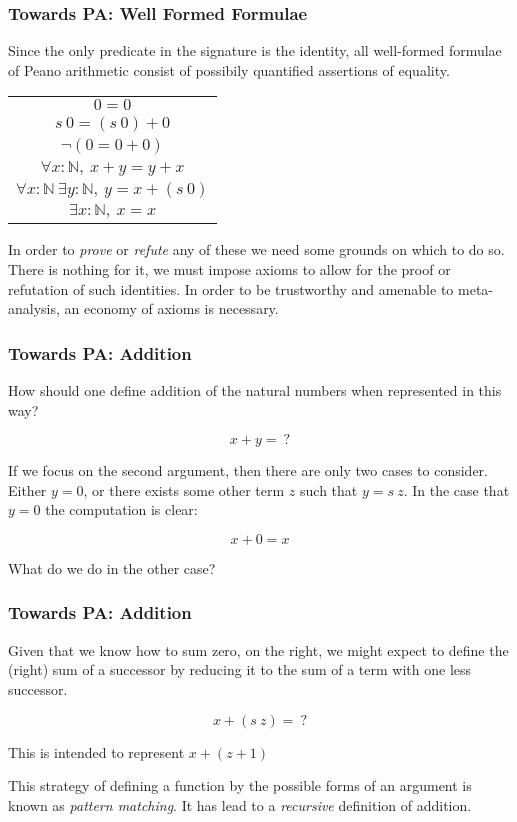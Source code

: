 \documentclass{beamer}
\theoremstyle{indentDefn} \newtheorem{defn}[]{Definition}
\begin{document}
\begin{frame}
	\frametitle{Towards PA: Well Formed Formulae}

	Since the only predicate in the signature is the identity, all well-formed formulae of Peano arithmetic consist of possibily quantified assertions of equality. 

	\begin{center}
		\begin{tabular}{c}
			$0 = 0$ \\
			$s \ 0 = (s \ 0) + 0$ \\
			$\lnot (0 = 0 + 0)$ \\
			$\forall x : \mathbb{N}, \ x + y = y + x$ \\
			$\forall x : \mathbb{N} \ \exists y : \mathbb{N}, \ y = x + (s \ 0)$ \\
			$\exists x : \mathbb{N}, \ x = x$
		\end{tabular}
	\end{center}

	In order to \emph{prove} or \emph{refute} any of these we need some grounds on which to do so. There is nothing for it, we must impose axioms to allow for the proof or refutation of such identities. In order to be trustworthy and amenable to meta-analysis, an economy of axioms is necessary. 

\end{frame}

\begin{frame}
	\frametitle{Towards PA: Addition}
	How should one define addition of the natural numbers when represented in this way? 

	$$ x + y =  \ ?$$

	If we focus on the second argument, then there are only two cases to consider. Either $y = 0$, or there exists some other term $z$ such that $y = s \ z$. In the case that $y = 0$ the computation is clear: 

	$$x + 0 = x$$

	What do we do in the other case? 


\end{frame}

\begin{frame}
	\frametitle{Towards PA: Addition}

	Given that we know how to sum zero, on the right, we might expect to define the (right) sum of a successor by reducing it to the sum of a term with one less successor. 

	$$ x + (s \ z) =  \ ?$$

	This is intended to represent $x + (z + 1)$

	\vspace{25mm}

	This strategy of defining a function by the possible forms of an argument is known as \emph{pattern matching}. It has lead to a \emph{recursive} definition of addition.
\end{frame}
\end{document}

